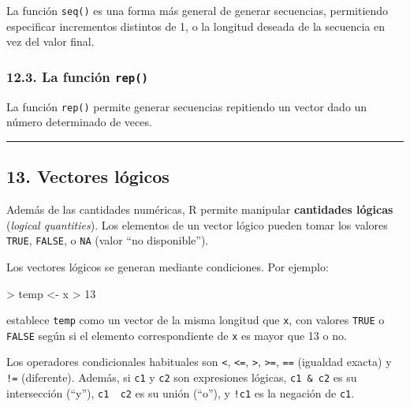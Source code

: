 \documentclass[
  jou,
  floatsintext,
  longtable,
  a4paper,
  nolmodern,
  notxfonts,
  notimes,
  12pt,
  colorlinks=true,linkcolor=blue,citecolor=blue,urlcolor=blue]{apa7}
\newenvironment{Shaded}{\begin{snugshade}}{\end{snugshade}}
\newcommand{\DecValTok}[1]{\textcolor[rgb]{0.68,0.00,0.00}{#1}}
\newcommand{\NormalTok}[1]{\textcolor[rgb]{0.00,0.23,0.31}{#1}}
\newcommand{\OtherTok}[1]{\textcolor[rgb]{0.00,0.23,0.31}{#1}}
\newcommand{\SpecialCharTok}[1]{\textcolor[rgb]{0.37,0.37,0.37}{#1}}
\begin{document}
La función \texttt{seq()} es una forma más general de generar
secuencias, permitiendo especificar incrementos distintos de 1, o la
longitud deseada de la secuencia en vez del valor final.

\subsubsection{\texorpdfstring{12.3. La función
\texttt{rep()}}{12.3. La función rep()}}\label{la-funciuxf3n-rep}

La función \texttt{rep()} permite generar secuencias repitiendo un
vector dado un número determinado de veces.

\begin{center}\rule{0.5\linewidth}{0.5pt}\end{center}

\subsection{13. Vectores lógicos}\label{vectores-luxf3gicos}

Además de las cantidades numéricas, R permite manipular
\textbf{cantidades lógicas} (\emph{logical quantities}). Los elementos
de un vector lógico pueden tomar los valores \texttt{TRUE},
\texttt{FALSE}, o \texttt{NA} (valor ``no disponible'').

Los vectores lógicos se generan mediante condiciones. Por ejemplo:

\begin{Shaded}
\begin{Highlighting}[]
\SpecialCharTok{\textgreater{}}\NormalTok{ temp }\OtherTok{\textless{}{-}}\NormalTok{ x }\SpecialCharTok{\textgreater{}} \DecValTok{13}
\end{Highlighting}
\end{Shaded}

establece \texttt{temp} como un vector de la misma longitud que
\texttt{x}, con valores \texttt{TRUE} o \texttt{FALSE} según si el
elemento correspondiente de \texttt{x} es mayor que 13 o no.

Los operadores condicionales habituales son \texttt{\textless{}},
\texttt{\textless{}=}, \texttt{\textgreater{}},
\texttt{\textgreater{}=}, \texttt{==} (igualdad exacta) y \texttt{!=}
(diferente). Además, si \texttt{c1} y \texttt{c2} son expresiones
lógicas, \texttt{c1\ \&\ c2} es su intersección (``y''),
\texttt{c1\ \textbar{}\ c2} es su unión (``o''), y \texttt{!c1} es la
negación de \texttt{c1}.
\end{document}

